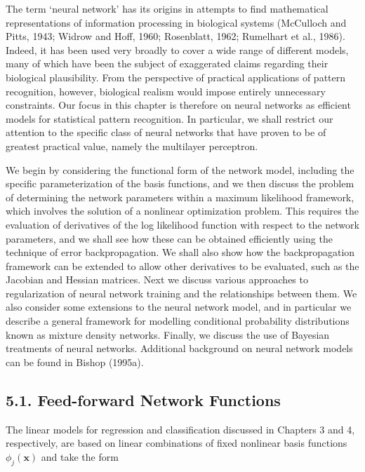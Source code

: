 \documentclass[
  10
]{article}
\begin{document}
The term `neural network' has its origins in attempts to find
mathematical representations of information processing in biological
systems (McCulloch and Pitts, 1943; Widrow and Hoff, 1960; Rosenblatt,
1962; Rumelhart et al., 1986). Indeed, it has been used very broadly to
cover a wide range of different models, many of which have been the
subject of exaggerated claims regarding their biological plausibility.
From the perspective of practical applications of pattern recognition,
however, biological realism would impose entirely unnecessary
constraints. Our focus in this chapter is therefore on neural networks
as efficient models for statistical pattern recognition. In particular,
we shall restrict our attention to the specific class of neural networks
that have proven to be of greatest practical value, namely the
multilayer perceptron.

We begin by considering the functional form of the network model,
including the specific parameterization of the basis functions, and we
then discuss the problem of determining the network parameters within a
maximum likelihood framework, which involves the solution of a nonlinear
optimization problem. This requires the evaluation of derivatives of the
log likelihood function with respect to the network parameters, and we
shall see how these can be obtained efficiently using the technique of
error backpropagation. We shall also show how the backpropagation
framework can be extended to allow other derivatives to be evaluated,
such as the Jacobian and Hessian matrices. Next we discuss various
approaches to regularization of neural network training and the
relationships between them. We also consider some extensions to the
neural network model, and in particular we describe a general framework
for modelling conditional probability distributions known as mixture
density networks. Finally, we discuss the use of Bayesian treatments of
neural networks. Additional background on neural network models can be
found in Bishop (1995a).

\subsection{5.1. Feed-forward Network
Functions}\label{feed-forward-network-functions}

The linear models for regression and classification discussed in
Chapters 3 and 4, respectively, are based on linear combinations of
fixed nonlinear basis functions \(\phi _ { j } ( \mathbf { x } )\) and
take the form
\end{document}
